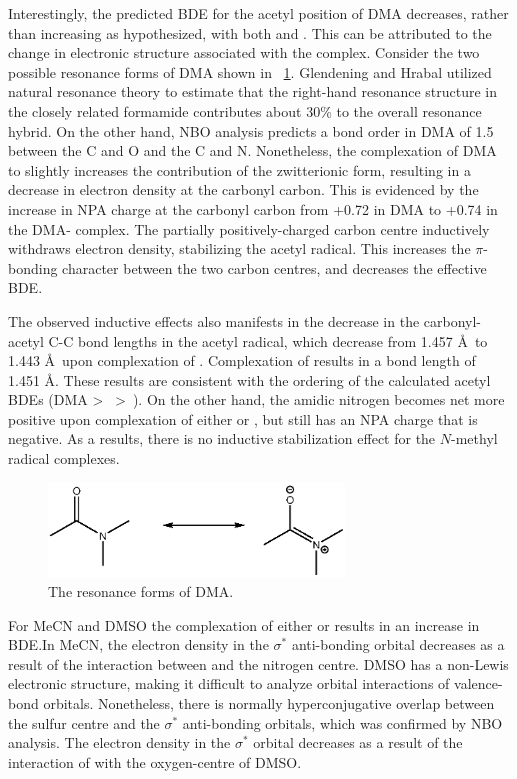 \begin{doublespace}
Interestingly, the predicted BDE for the acetyl position of DMA decreases,
rather than increasing as hypothesized, with both  and . This
can be attributed to the change in electronic structure associated with the
complex. Consider the two possible resonance forms of DMA shown in
~\ref{fig:dma-res}. Glendening and Hrabal\cite{Hrabal1997} utilized natural
resonance theory to estimate that the right-hand resonance structure in the
closely related formamide contributes about 30\% to the overall resonance
hybrid. On the other hand, NBO analysis predicts a bond order in DMA of 1.5
between the C and O and the C and N. Nonetheless, the complexation of DMA to
 slightly increases the contribution of the zwitterionic form,
resulting in a decrease in electron density at the carbonyl carbon. This is
evidenced by the increase in NPA charge at the carbonyl carbon from +0.72 in DMA
to +0.74 in the DMA- complex. The partially positively-charged carbon
centre inductively withdraws electron density, stabilizing the acetyl radical.
This increases the $\pi$-bonding character between the two carbon centres, and
decreases the effective BDE.

The observed inductive effects also manifests in the decrease in the
carbonyl-acetyl C-C bond lengths in the acetyl radical, which decrease from
1.457 \AA\ to 1.443 \AA\ upon complexation of . Complexation of
 results in a bond length of 1.451 \AA. These results are consistent
with the ordering of the calculated acetyl BDEs (DMA \textgreater\ 
\textgreater\ ). On the other hand, the amidic nitrogen becomes net
more positive upon complexation of either  or , but still has
an NPA charge that is negative. As a results, there is no inductive
stabilization effect for the $N$-methyl radical complexes.

\begin{figure}[!htpb]
  \centering
  \includegraphics[width=0.7\textwidth]{figures/DMA-resonance.eps}
  \caption{The resonance forms of DMA.}
  \label{fig:dma-res}
\end{figure}

For MeCN and DMSO the complexation of either  or  results in
an increase in  BDE.\@ In MeCN, the electron density in the 
$\sigma^*$ anti-bonding orbital decreases as a result of the interaction between
 and the nitrogen centre. DMSO has a non-Lewis electronic structure,
making it difficult to analyze orbital interactions of valence-bond orbitals.
Nonetheless, there is normally hyperconjugative overlap between the sulfur
centre and the  $\sigma^*$ anti-bonding orbitals, which was confirmed by
NBO analysis. The electron density in the  $\sigma^*$ orbital decreases
as a result of the interaction of  with the oxygen-centre of DMSO.


\end{doublespace}

